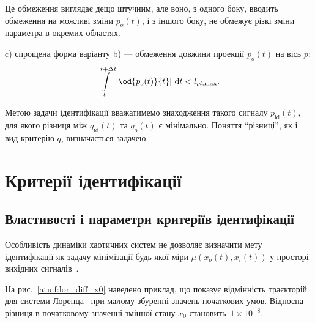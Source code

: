 Це обмеження виглядає дещо штучним, але воно, з одного боку,
вводить обмеження на можливі зміни
$ p_o (t) $, і з іншого боку, не обмежує різкі зміни параметра в
окремих областях.

c) спрощена форма варіанту b) --- обмеження довжини проекції
$ p_o (t) $ на вісь
$ p $:
%
\begin{equation}
  \int\limits_{t}^{t+\Delta t} \left| \od{p_o(t)}{t} \right | \, \mathrm{d}t < l_{pl,\max}.
  \label{atu:eq:p_lim_pl}
\end{equation}

Метою задачи ідентифікації вважатимемо знаходження такого
сигналу
$ p_\mathrm{id}(t) $, для якого різниця
між $ q_\mathrm{id}(t) $ та
$q_o(t) $\label{atu:d:q_o} є мінімально. Поняття ``різниці'', як і вид критерію
$q$, визначається задачею.


\section{Критерії ідентифікації} %

\subsection{Властивості і параметри критеріїв ідентифікації} %

Особливість динаміки хаотичних систем не дозволяє визначити мету ідентифікації
як задачу мінімізації будь-якої міри
$\mu(x_o(t), x_i(t))$ у просторі вихідних
сигналів~\cite{atu_asau11,atu_asau12,atu_asau14,atu_electronika2013}.


На рис.~\ref{atu:f:lor_diff_x0} наведено приклад, що показує відмінність
траєкторій для системи Лоренца~\cite{moon_chaotic_vibr} при малому збуренні
значень початкових умов. Відносна різниця в початковому
значенні змінної стану
$x_0$ становить~$1 \times 10^{-8}$.

